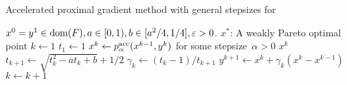 \documentclass[../main]{subfiles}
\begin{document}
\begin{algorithm}[hbtp]
    \caption{Accelerated proximal gradient method with general stepsizes for~}
    \begin{algorithmic}[1]
        \Require $x^0 = y^1 \in \operatorname{dom}(F), a \in [0, 1), b \in [a^2 / 4, 1 / 4], \varepsilon > 0$.
        \Ensure $x^\ast$: A weakly Pareto optimal point
        \State $k \gets 1$
        \State $t_1 \gets 1$ 
        \Loop
        \State $x^k \gets p^{\mathrm{acc}}_\alpha(x^{k - 1}, y^k)$ for some stepsize~$\alpha > 0$
        \State \Return $x^k$
        \EndIf
        \State $t_{k + 1} \gets \sqrt{t_k^2 - a t_k + b} + 1/2$ 
        \State $\gamma_k \gets (t_k - 1) / t_{k + 1}$ 
        \State $y^{k + 1} \gets x^k + \gamma_k (x^k - x^{k - 1})$ 
        \State $k \gets k + 1$
        \EndLoop
    \end{algorithmic}
\end{algorithm}
\end{document}
